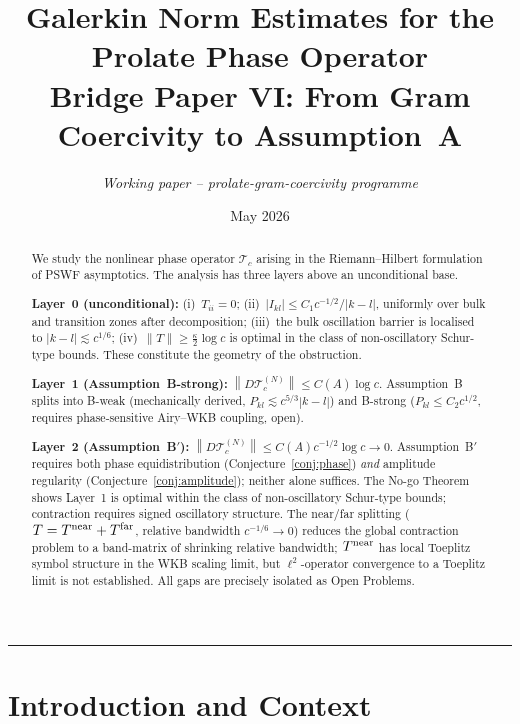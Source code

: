 \documentclass[12pt,a4paper]{article}
\title{%
  \textbf{Galerkin Norm Estimates for the Prolate Phase Operator}\\[0.5em]
  \large Bridge Paper VI: From Gram Coercivity to Assumption~A
}
\author{\textit{Working paper -- prolate-gram-coercivity programme}}
\date{May 2026}
\newcommand{\norm}[1]{\left\|#1\right\|}
\begin{document}
\maketitle

\begin{abstract}
We study the nonlinear phase operator $\mathcal{T}_c$ arising in the
Riemann--Hilbert formulation of PSWF asymptotics.
The analysis has three layers above an unconditional base.

\smallskip\noindent\textbf{Layer~0 (unconditional):}
(i)~$T_{ii}=0$;
(ii)~$|I_{kl}|\leq C_1c^{-1/2}/|k-l|$, uniformly over bulk and
transition zones after decomposition;
(iii)~the bulk oscillation barrier is localised to
$|k-l|\lesssim c^{1/6}$;
(iv)~$\|T\|\geq\tfrac{\kappa}{2}\log c$ is optimal in the class
of non-oscillatory Schur-type bounds.
These constitute the geometry of the obstruction.

\smallskip\noindent\textbf{Layer~1 (Assumption~B-strong):}
$\norm{D\mathcal{T}_c^{(N)}}\leq C(A)\log c$.
Assumption~B splits into B-weak (mechanically derived,
$P_{kl}\lesssim c^{5/3}|k-l|$) and B-strong
($P_{kl}\leq C_2c^{1/2}$, requires phase-sensitive
Airy--WKB coupling, open).

\smallskip\noindent\textbf{Layer~2 (Assumption~B$'$):}
$\norm{D\mathcal{T}_c^{(N)}}\leq C(A)c^{-1/2}\log c\to 0$.
Assumption~B$'$ requires both phase equidistribution
(Conjecture~\ref{conj:phase}) \emph{and} amplitude regularity
(Conjecture~\ref{conj:amplitude}); neither alone suffices.
The No-go Theorem shows Layer~1 is optimal within the
class of non-oscillatory Schur-type bounds;
contraction requires signed oscillatory structure.
The near/far splitting ($T=T^{\rm near}+T^{\rm far}$,
relative bandwidth $c^{-1/6}\to 0$) reduces the global
contraction problem to a band-matrix of shrinking relative bandwidth;
$T^{\rm near}$ has local Toeplitz symbol structure in the WKB
scaling limit, but $\ell^2$-operator convergence to a Toeplitz
limit is not established.
All gaps are precisely isolated as Open Problems.
\end{abstract}

\tableofcontents
\bigskip\hrule\bigskip

\section{Introduction and Context}
\end{document}
